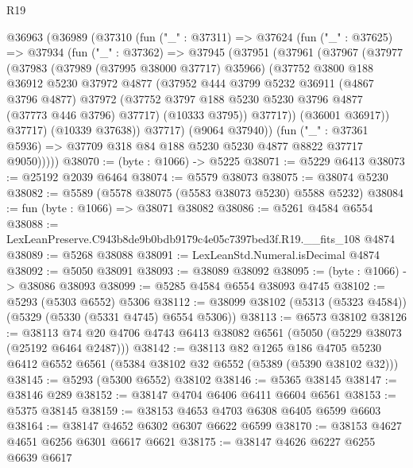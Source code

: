\begin{lexlean}{R19}
\begin{coremodule}
  @36963
    (@36989
      (@37310
        (fun ("_" : @37311) =>
        @37624
          (fun ("_" : @37625) =>
          @37934
            (fun ("_" : @37362) =>
            @37945
              (@37951
                (@37961
                  (@37967
                    (@37977
                      (@37983
                        (@37989 (@37995 @38000 @37717) @35966)
                        (@37752
                          @3800
                          @188
                          @36912
                          @5230
                          @37972
                          @4877
                          (@37952
                            @444
                            @3799
                            @5232
                            @36911
                            (@4867 @3796 @4877)
                            @37972
                            (@37752 @3797 @188 @5230 @5230 @3796 @4877 (@37773 @446 @3796) @37717)
                            (@10333 @3795))
                          @37717))
                      (@36001 @36917))
                    @37717)
                  (@10339 @37638))
                @37717)
              (@9064 @37940))
            (fun ("_" : @37361 @5936) =>
            @37709 @318 @84 @188 @5230 @5230 @4877 @8822 @37717 @9050)))))
@38070 := (byte : @1066) -> @5225
@38071 := @5229 @6413
@38073 := @25192 @2039 @6464
@38074 := @5579 @38073
@38075 := @38074 @5230
@38082 := @5589 (@5578 @38075 (@5583 @38073 @5230) @5588 @5232)
@38084 := fun (byte : @1066) => @38071 @38082
@38086 := @5261 @4584 @6554
@38088 := LexLeanPreserve.C943b8de9b0bdb9179c4e05c7397bed3f.R19.__fits_108 @4874
@38089 := @5268 @38088
@38091 := LexLeanStd.Numeral.isDecimal @4874
@38092 := @5050 @38091
@38093 := @38089 @38092
@38095 := (byte : @1066) -> @38086 @38093
@38099 := @5285 @4584 @6554 @38093 @4745
@38102 := @5293 (@5303 @6552) @5306
@38112 := @38099 @38102 (@5313 (@5323 @4584)) (@5329 (@5330 (@5331 @4745) @6554 @5306))
@38113 := @6573 @38102
@38126 := @38113 @74 @20 @4706 @4743 @6413 @38082 @6561 (@5050 (@5229 @38073 (@25192 @6464 @2487)))
@38142 := @38113
    @82
    @1265
    @186
    @4705
    @5230
    @6412
    @6552
    @6561
    (@5384 @38102 @32 @6552 (@5389 (@5390 @38102 @32)))
@38145 := @5293 (@5300 @6552) @38102
@38146 := @5365 @38145
@38147 := @38146 @289
@38152 := @38147 @4704 @6406 @6411 @6604 @6561
@38153 := @5375 @38145
@38159 := @38153 @4653 @4703 @6308 @6405 @6599 @6603
@38164 := @38147 @4652 @6302 @6307 @6622 @6599
@38170 := @38153 @4627 @4651 @6256 @6301 @6617 @6621
@38175 := @38147 @4626 @6227 @6255 @6639 @6617

\end{coremodule}
\end{lexlean}
